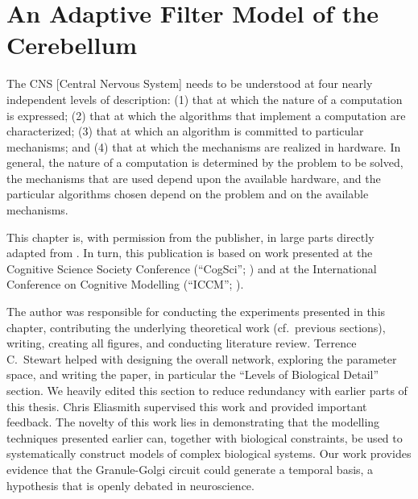 
\chapter{An Adaptive Filter Model of the Cerebellum}
\label{chp:cerebellum}

\vspace{15pt}

\begin{OpeningQuote}
The CNS [Central Nervous System] needs to be understood at four nearly independent levels of description: (1) that at which the nature of a computation is expressed; (2) that at which the algorithms that implement a computation are characterized; (3) that at which an algorithm is committed to particular mechanisms; and (4) that at which the mechanisms are realized in hardware.
In general, the nature of a computation is determined by the problem to be solved, the mechanisms that are used depend upon the available hardware, and the particular algorithms chosen depend on the problem and on the available mechanisms.
\end{OpeningQuote}

\begin{PriorPublication}
This chapter is, with permission from the publisher, in large parts directly adapted from \citet{stockel2021connecting}.
In turn, this publication is based on work presented at the Cognitive Science Society Conference (\enquote{CogSci}; \cite{stockel2020biologically}) and at the International Conference on Cognitive Modelling (\enquote{ICCM}; \cite{stockel2020connecting}).
\end{PriorPublication}

\begin{Contributions}
The author was responsible for conducting the experiments presented in this chapter, contributing the underlying theoretical work (cf.~previous sections), writing, creating all figures, and conducting literature review.
Terrence C.~Stewart helped with designing the overall network, exploring the parameter space, and writing the paper, in particular the \enquote{Levels of Biological Detail} section.
We heavily edited this section to reduce redundancy with earlier parts of this thesis.
Chris Eliasmith supervised this work and provided important feedback.
The novelty of this work lies in demonstrating that the modelling techniques presented earlier can, together with biological constraints, be used to systematically construct models of complex biological systems.
Our work provides evidence that the Granule-Golgi circuit could generate a temporal basis, a hypothesis that is openly debated in neuroscience.
\end{Contributions}

